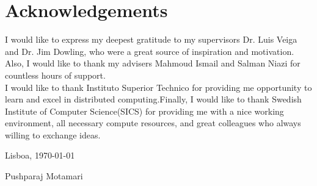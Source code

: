 \newpage


\chapter*{Acknowledgements}
\thispagestyle{empty}


I would like to express my deepest gratitude to my supervisors Dr. Luis Veiga and Dr. Jim Dowling, who were a great source of inspiration and motivation. Also, I
would like to thank my advisers Mahmoud Ismail and Salman Niazi for countless
hours of support.\\
\hspace{4 em}I would like to thank  Instituto Superior Technico for providing me opportunity to learn and excel in distributed computing.Finally, I would like to thank Swedish Institute of Computer Science(SICS) for providing me with a nice working environment, all necessary compute
resources, and great colleagues who always willing to exchange ideas.


\vfill
\begin{flushright}
  \begin{minipage}{8cm}
    \begin{center}
      Lisboa, \today

      Pushparaj Motamari
    \end{center}
  \end{minipage}
\end{flushright}



